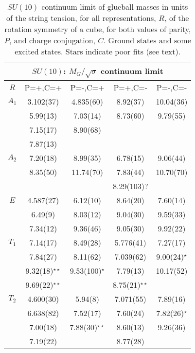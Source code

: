\documentclass[12pt]{article}
\begin{document}
\begin{table}[htb]
\centering
\begin{tabular}{|c|c|c|c|c|} \hline
\multicolumn{5}{|c|}{$SU(10)$: $M_G/\surd\sigma$  continuum limit} \\ \hline
  $R$   & P=+,C=+ & P=-,C=+ &  P=+,C=-   &  P=-,C=-   \\ \hline
$A_1$  & 3.102(37) & 4.835(60) & 8.92(37)  & 10.04(36)  \\
    & 5.99(13)  & 7.03(14)  & 8.73(60)  &  9.79(55)  \\
    & 7.15(17)  & 8.90(68)  &           &            \\
    & 7.87(13)  &           &           &            \\ \hline
$A_2$  & 7.20(18)  & 8.99(35)  & 6.78(15)  & 9.06(44)   \\
    & 8.35(50)  & 11.74(70) & 7.83(44)  & 10.70(70)  \\
    &           &           & 8.29(103)?&   \\ \hline
$E$   & 4.587(27) & 6.12(10)  & 8.64(20)  & 7.60(14)  \\
    & 6.49(9)   & 8.03(12)  & 9.04(30)  & 9.59(33)  \\
    & 7.34(12)  & 9.36(46)  & 9.05(30)  & 9.92(22) \\ \hline
$T_1$  & 7.14(17)  & 8.49(28)  & 5.776(41) & 7.27(17)  \\
    & 7.84(27)  & 8.11(62)  & 7.039(62) & 9.00(24)$^\star$  \\
    & 9.32(18)$^{\star\star}$ & 9.53(100)$^\star$ & 7.79(13) & 10.17(52)  \\
    & 9.69(22)$^{\star\star}$ &   & 8.75(21)$^{\star\star}$ &          \\ \hline
$T_2$  & 4.600(30) & 5.94(8)   & 7.071(55) & 7.89(16)  \\
    & 6.638(82) & 7.52(17)  & 7.60(24)  & 7.82(26)$^\star$  \\
    & 7.00(18)  & 7.88(30)$^{\star\star}$ & 8.60(13) &  9.26(36) \\
    & 7.19(22)  &           & 8.77(28)  &           \\ \hline
\end{tabular}
\caption{$SU(10)$ continuum limit of glueball masses in units of the string tension,
  for all representations, $R$, of the rotation symmetry of a cube, for
  both values of parity, $P$, and charge conjugation, $C$.
  Ground states and some excited states. Stars
  indicate poor fits (see text).}
\label{table_MK_R_SU10}
\end{table}
\end{document}
